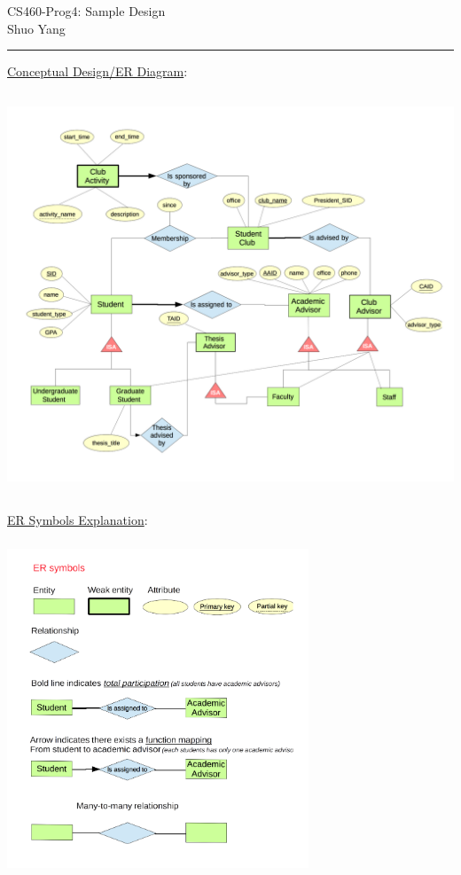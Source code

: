 \documentclass[10pt]{article}
\def\Author{Shuo Yang}
\begin{document}
\noindent

\begin{center}
  CS460-Prog4: Sample Design\\
  \Author\\
\end{center}

\hrule\smallskip

\vspace{1em}
\underline{Conceptual Design/ER Diagram}:
\begin{center}
  \includegraphics[width=14cm,height=12cm]{./cs460-prog4-er.png}
\end{center}

\underline{ER Symbols Explanation}:
\begin{center}
  \includegraphics[width=9cm,height=10cm]{./cs460-proj4-legend.png}
\end{center}
\end{document}
